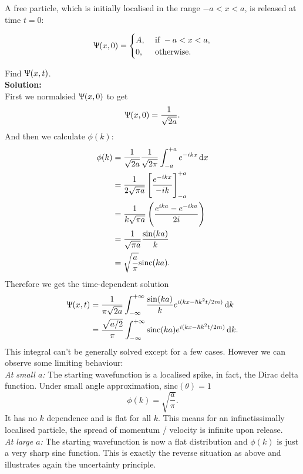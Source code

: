 \begin{wex}
A free particle, which is initially localised in the range $-a<x<a$, is released at time $t=0$:
\begin{singlespace}
\begin{equation}
\Uppsi(x,0)=
\begin{cases}
A,\ &\text{if }-a<x<a,\\
0,\ &\text{otherwise}.
\end{cases}
\end{equation}
\end{singlespace}
Find $\Uppsi(x,t)$.\\
\textbf{Solution: }\\
First we normalsied $\Uppsi(x,0)$ to get
\begin{equation}
\Uppsi(x,0)=\frac{1}{\sqrt{2a}}.
\end{equation}
And then we calculate $\phi(k)$:
\begin{subequations}
\begin{align}
\phi(k)&=\frac{1}{\sqrt{2a}}\frac{1}{\sqrt{2\pi}}\int^{+a}_{-a}e^{-ikx}\dx \\
&=\frac{1}{2\sqrt{\pi a}}\lf[\frac{e^{-ikx}}{-ik}\rt]^{+a}_{-a}\\
&=\frac{1}{k\sqrt{\pi a}}\lf(\frac{e^{ika}-e^{-ika}}{2i} \rt)\\
&=\frac{1}{\sqrt{\pi a}}\frac{\sin(ka)}{k}\\
&=\sqrt{\frac{a}{\pi}}\text{sinc}(ka).
\end{align}
\end{subequations}
Therefore we get the time-dependent solution
\begin{equation}
\begin{aligned}
\ups(x,t)&=\frac{1}{\pi\sqrt{2a}}\intinf\frac{\sin(ka)}{k}e^{i(kx-\hbar k^2t/2m)}\dif k\\
&=\frac{\sqrt{a/2}}{\pi}\intinf\text{sinc}(ka)e^{i(kx-\hbar k^2t/2m)}\dif k.
\end{aligned}
\end{equation}
This integral can't be generally solved except for a few cases. However we can observe some limiting behaviour: \\
\textit{At small $a$: }The starting wavefunction is a localised spike, in fact, the Dirac delta function. Under small angle approximation, $\text{sinc}(\theta)=1$
\begin{equation}
\phi(k)=\sqrt{\frac{a}{\pi}}.
\end{equation}
It has no $k$ dependence and is flat for all $k$. This means for an infinetissimally localised particle, the spread of momentum / velocity is infinite upon release.\\
\textit{At large $a$: }The starting wavefunction is now a flat distribution and $\phi(k)$ is just a very sharp sinc function. This is exactly the reverse situation as above and illustrates again the uncertainty principle. 
\end{wex}
